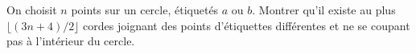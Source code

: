 On choisit $n$ points sur un cercle, étiquetés $a$ ou $b$. Montrer qu'il existe au plus $\lfloor (3n + 4)/2 \rfloor$ cordes joignant des points d'étiquettes différentes et ne se coupant pas à l'intérieur du cercle.
